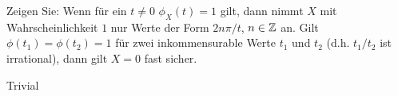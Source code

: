 \begin{exercise}

Zeigen Sie: Wenn für ein $t \neq 0$ $\phi_X(t) = 1$ gilt, dann nimmt $X$ mit Wahrscheinlichkeit $1$ nur Werte der Form $2n \pi/t$, $n \in \mathbb{Z}$ an. Gilt $\phi(t_1) = \phi(t_2) = 1$ für zwei inkommensurable Werte $t_1$ und $t_2$ (d.h. $t_1/t_2$ ist irrational), dann gilt $X = 0$ fast sicher.

\end{exercise}

\begin{solution}

Trivial

\end{solution}

